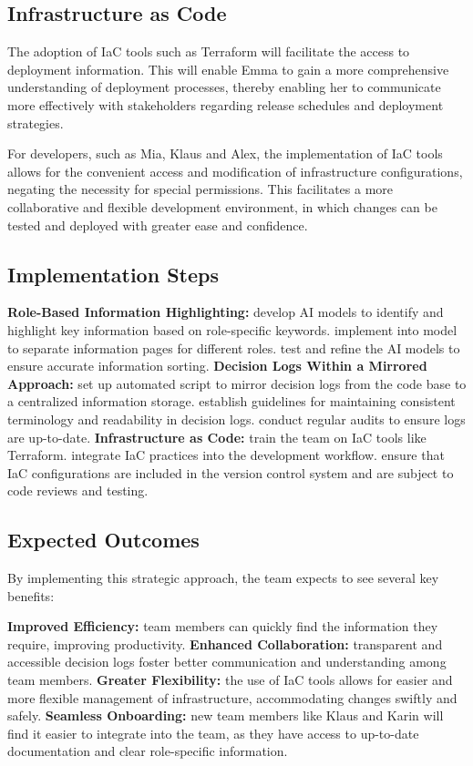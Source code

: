 \subsection*{Infrastructure as Code}
The adoption of \ac{IaC} tools such as Terraform will facilitate the access to deployment information. This will enable Emma to gain a more comprehensive understanding of deployment processes, thereby enabling her to communicate more effectively with stakeholders regarding release schedules and deployment strategies.

For developers, such as Mia, Klaus and Alex, the implementation of \ac{IaC} tools allows for the convenient access and modification of infrastructure configurations, negating the necessity for special permissions. This facilitates a more collaborative and flexible development environment, in which changes can be tested and deployed with greater ease and confidence.

\subsection*{Implementation Steps}
\begin{outline}
    \1 \textbf{Role-Based Information Highlighting:}
        \2 develop \ac{AI} models to identify and highlight key information based on role-specific keywords.
        \2 implement into model to separate information pages for different roles.
        \2 test and refine the AI models to ensure accurate information sorting.
    \1 \textbf{Decision Logs Within a Mirrored Approach:}
        \2 set up automated script to mirror decision logs from the code base to a centralized information storage.
        \2 establish guidelines for maintaining consistent terminology and readability in decision logs.
        \2 conduct regular audits to ensure logs are up-to-date.
    \1 \textbf{Infrastructure as Code:}
        \2 train the team on \ac{IaC} tools like Terraform.
        \2 integrate \ac{IaC} practices into the development workflow.
        \2 ensure that \ac{IaC} configurations are included in the version control system and are subject to code reviews and testing.
\end{outline}

\subsection*{Expected Outcomes}
By implementing this strategic approach, the team expects to see several key benefits:
\begin{outline}
    \1 \textbf{Improved Efficiency:} team members can quickly find the information they require, improving productivity.
    \1 \textbf{Enhanced Collaboration:} transparent and accessible decision logs foster better communication and understanding among team members.
    \1 \textbf{Greater Flexibility:} the use of \ac{IaC} tools allows for easier and more flexible management of infrastructure, accommodating changes swiftly and safely.
    \1 \textbf{Seamless Onboarding:} new team members like Klaus and Karin will find it easier to integrate into the team, as they have access to up-to-date documentation and clear role-specific information.
\end{outline}

